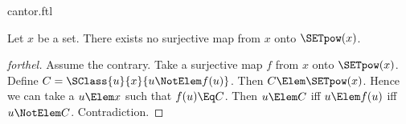 \documentclass{stex}
\begin{document}
\begin{smodule}{cantor.ftl}

\begin{theorem}[forthel,title=Cantor's Theorem,id=cantor_017529138285230]
  Let $x$ be a set.
  There exists no surjective map from $x$ onto $\SETpow(x)$.
\end{theorem}
\begin{proof}[forthel]
  Assume the contrary.
  Take a surjective map $f$ from $x$ onto $\SETpow(x)$.
  Define $C = \SClass{u}{x}{u \NotElem f(u)}$.
  Then $C \Elem \SETpow(x)$.
  Hence we can take a $u \Elem x$ such that $f(u) \Eq C$.
  Then $u \Elem C$ iff $u \Elem f(u)$ iff $u \NotElem C$.
  Contradiction.
\end{proof}
\end{smodule}
\end{document}
